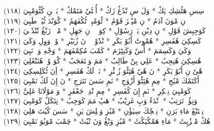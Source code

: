 \documentclass[a4paper, 10pt]{report}
\begin{document}
\begin{center}
\textarabic{(١١٨) \textcolor{mygreen}{سِسِ هَٹُشِكِ يَكٗ  * وَلَ سِ نْدُڠُ زَكٗ  * أُئٖٹَيٗ مَتَمْكٗ  * يَپٖسٖنِ كُٹْوَمْبِيَ }} 
\\[5mm] 

\textarabic{(١١٩) \textcolor{mygreen}{وٖوٖ نِ مْوَنَ آدَمُ  * نِ مْپٗتٖزَ قَوْمُ  * ٹْوَمْبِيٖ ٹُكُفَهَمُ  * كْوَنْدَ ٹُيُوٖ طَبِيَ }} 
\\[5mm] 

\textarabic{(١٢٠) \textcolor{mygreen}{كَوَجِبِشَ قَوْلِ  * نِ دِيْنِ يَكٖ رَسُوْلِ  * كِوَ وٖوٖ نِ جَهِلِ  * مْبٖلٖ زَنْڠُ نٗنْدٗكٖيَ }} 
\\[5mm] 

\textarabic{(١٢١) \textcolor{mygreen}{كَسِكِيَ هُفَسِرِ  * هُمْوِٹَ أَبُوْ بَكَرِ  * نْدٗوْ وٖوٖ نَ زُبَيْرِ  * وٗتٖ وَوِلِ وَكَيَ }} 
\\[5mm] 

\textarabic{(١٢٢) \textcolor{mygreen}{وَكَيَ وَكَسِمَمَ  * أُسٗ وَكَنِٹِزَمَ  * كَمْبَ مُكِمْفَهَمَ  * وَجْهِ وَكٖ نَبِيَ }} 
\\[5mm] 

\textarabic{(١٢٣) \textcolor{mygreen}{هُسِكِيَ هُنِجِبُ  * عَلِي بِنْ طَالِبُ  * مَمَ وَمٖتَعَجَبُ  * كْوَ وٗتٖ هُنَنْڠَلِيَ }} 
\\[5mm] 

\textarabic{(١٢٤) \textcolor{mygreen}{هٗىٗ نِ أَبُوْ بَكَرِ  * نَ هٗيٗ هُئِٹْوَ زُبٖئْرِ  * نَوٖ لَكٗ هُفَسِرِ  * أِنَ ٹُكَلِسِكِيَ }} 
\\[5mm] 

\textarabic{(١٢٥) \textcolor{mygreen}{أَكَتَمْكَ مْبُجِ  * مِمِ هُئِٹْوَ أَزْوَجِ  * نَمِ سَسَ نَتَرَجِ  * نَ إِنَ لَكٗ نَمْبِيَ }} 
\\[5mm] 

\textarabic{(١٢٦) \textcolor{mygreen}{كَوَمْبِيَ نِمٖكِرِ  * نَمِ إِنَ كُفَسِرِ  * مِمِ نْدِيٖ جَعْفَرِ  * وَ مَوْلَانَا عَلِيَّ }} 
\\[5mm] 

\textarabic{(١٢٧) \textcolor{mygreen}{وَنِؤُزٖ تَرَتِبُ  * وٖنْدَءٗ وَپِ غَرِيْبُ  * هَپٗ مَمَ كَوَجِبُ  * نِتَكَلٗ كَوَمْبِيَ }} 
\\[5mm] 

\textarabic{(١٢٨) \textcolor{mygreen}{نِمٖتَنْڠَ مَاءِ بَرَنِ  * نِمٖچٗكَ سِيَؤٗنِ  * مْبُزِ وَمٖلِشَ يَنِ  * سَسَ كُيُتَ هَلِيَ }} 
\\[5mm] 

\textarabic{(١٢٩) \textcolor{mygreen}{هُكٗ مْمٖزٗپِٹَ  * مَاءِ هَمْكُيَكُٹَ  * مْبُزِ وَنْڠُ وَنَ نْيٗٹَ  * چَمْبَ مْوَيُوَ نَمْبِيَ }} 
\\[5mm] 


\end{center}
\end{document}
